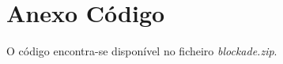 \documentclass[a4paper]{article}
\begin{document}
\clearpage
{}
\renewcommand\refname{Bibliografia}



\newpage
\appendix
\section{Anexo Código}
O código encontra-se disponível no ficheiro \textit{blockade.zip}.
\end{document}
